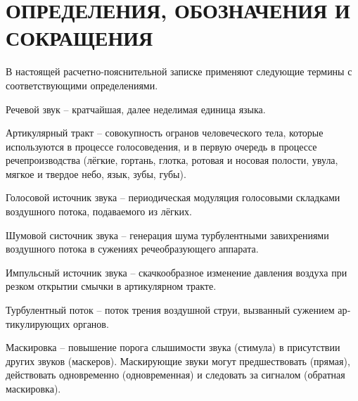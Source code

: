 \chapter*{ОПРЕДЕЛЕНИЯ, ОБОЗНАЧЕНИЯ И СОКРАЩЕНИЯ}

В настоящей расчетно-пояснительной записке применяют следующие термины с соответствующими определениями.

\begin{enumdescript}
	\item[Речевой звук] -- кратчайшая, далее неделимая единица языка.
	\item[Артикулярный тракт] -- совокупность огранов человеческого тела,  которые используются в процессе голосоведения, и в первую очередь в процессе речепроизводства (лёгкие, гортань,  глотка, ротовая и носовая полости, увула, мягкое и твердое небо, язык, зубы, губы). 
	\item[Голосовой источник звука] -- периодическая модуляция голосовыми складками воздушного потока, подаваемого из лёгких.
	\item[Шумовой систочник звука] -- генерация шума турбулентными завихрениями воздушного потока в сужениях речеобразующего аппарата.
	\item[Импульсный источник звука] -- скачкообразное изменение давления воздуха при резком открытии смычки в артикулярном тракте.
	\item[Турбулентный поток] -- поток тре­ния воздушной струи, вы­званный су­же­ни­ем ар­тику­ли­рую­щих ор­га­нов.
	\item[Маскировка] -- повышение порога слышимости звука (стимула) в присутствии других звуков (маскеров). Маскирующие звуки могут предшествовать (прямая), действовать одновременно (одновременная) и следовать за сигналом (обратная маскировка).

\end{enumdescript}